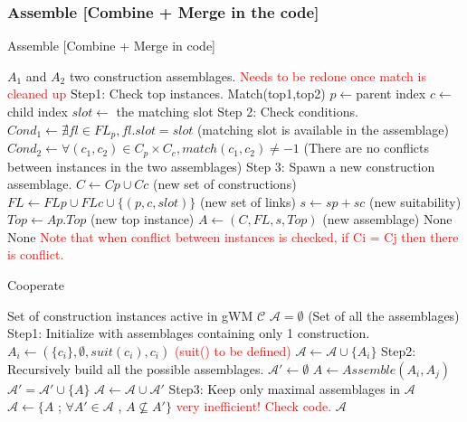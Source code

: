 \documentclass{article}
\newcommand\todo[1]{\textcolor{red}{#1}}
\begin{document}
\subsubsection{Assemble [Combine + Merge in the code]}

\begin{algorithm}[H]
\caption{Assemble [Combine + Merge in code]}
\label{assemble}
\begin{algorithmic}
	\REQUIRE $A_1$ and $A_2$ two construction assemblages.
	\STATE \todo{Needs to be redone once match is cleaned up}
	\STATE Step1: Check top instances.
	\STATE Match(top1,top2)
		\STATE $p \leftarrow $parent index
		\STATE $c \leftarrow $child index
		\STATE $slot \leftarrow$ the matching slot
		\STATE Step 2: Check conditions.
		\STATE $Cond_1 \leftarrow \nexists fl \in FL_p, fl.slot = slot$ (matching slot is available in the assemblage)
		\STATE $Cond_2 \leftarrow \forall (c_1, c_2) \in C_p \times C_c, match(c_1, c_2) \neq -1$ (There are no conflicts between instances in the two assemblages)
			\STATE Step 3: Spawn a new construction assemblage.
			\STATE $C \leftarrow Cp \cup Cc$ (new set of constructions)
			\STATE $FL \leftarrow FLp \cup FLc \cup \lbrace (p,c,slot) \rbrace$ (new set of links)
			\STATE $s \leftarrow sp + sc$ (new suitability)
			\STATE $Top \leftarrow Ap.Top$ (new top instance)
			\RETURN $A \leftarrow (C, FL, s, Top)$ (new assemblage)
		\ELSE
			\RETURN None
		\ENDIF
	\ELSE
		\RETURN None
	\ENDIF
	\STATE \todo{Note that when conflict between instances is checked, if Ci = Cj then there is conflict.}
\end{algorithmic}
\end{algorithm}

\begin{algorithm}[H]
\caption{Cooperate}
\label{cooperate}
\begin{algorithmic}
	\REQUIRE Set of construction instances active in gWM $\mathcal{C}$
	\STATE $\mathcal{A} = \emptyset$ (Set of all the assemblages)
	\STATE Step1: Initialize with assemblages containing only 1 construction.
		\STATE $A_i \leftarrow (\lbrace c_i \rbrace,\emptyset, suit(c_i), c_i)$ \todo{(suit() to be defined)}
		\STATE $\mathcal{A} \leftarrow \mathcal{A} \cup \lbrace A_i \rbrace$
	\ENDFOR
	\STATE Step2: Recursively build all the possible assemblages.
	\REPEAT
		\STATE $\mathcal{A}' \leftarrow \emptyset$
			\STATE $A \leftarrow Assemble(A_i,A_j)$
				\STATE $\mathcal{A}' = \mathcal{A}' \cup \lbrace A \rbrace$
			\ENDIF
		\ENDFOR
		\STATE $\mathcal{A} \leftarrow \mathcal{A} \cup \mathcal{A}'$ 
	\STATE Step3: Keep only maximal assemblages in $\mathcal{A}$
	\STATE $\mathcal{A} \leftarrow \lbrace A$ ; $ \forall A' \in \mathcal{A}$ , $A \nsubseteq A' \rbrace$ \todo{very inefficient! Check code.}
	\RETURN $\mathcal{A}$
\end{algorithmic}
\end{algorithm}
\end{document}
